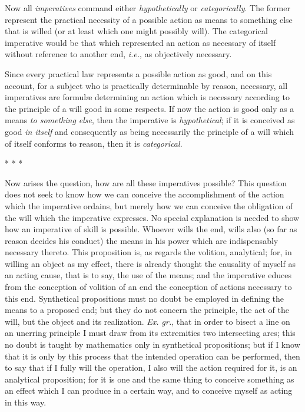 Now all \textit{imperatives} command either \textit{hypothetically} or
\textit{categorically}. The former represent the practical necessity
of a possible action as means to something else that is willed (or at
least which one might possibly will). The categorical imperative would
be that which represented an action as necessary of itself without
reference to another end, \textit{i.e.}, as objectively necessary.

Since every practical law represents a possible action as good, and on
this account, for a subject who is practically determinable by reason,
necessary, all imperatives are formul\ae{} determining an action which
is necessary according to the principle of a will good in some
respects. If now the action is good only as a means \textit{to
something else}, then the imperative is \textit{hypothetical}; if it
is conceived as good \textit{in itself} and consequently as being
necessarily the principle of a will which of itself conforms to
reason, then it is \textit{categorical}.

\begin{center}* * *\end{center}

Now arises the question, how are all these imperatives
possible? This question does not seek to know how we can conceive the
accomplishment of the action which the imperative ordains, but merely
how we can conceive the obligation of the will which the imperative
expresses. No special explanation is needed to show how an imperative
of skill is possible. Whoever wills the end, wills also (so far as
reason decides his conduct) the means in his power which are
indispensably necessary thereto. This proposition is, as regards the
volition, analytical; for, in willing an object as my effect, there is
already thought the causality of myself as an acting cause, that is to
say, the use of the means; and the imperative educes from the
conception of volition of an end the conception of actions necessary
to this end. Synthetical propositions must no doubt be employed in
defining the means to a proposed end; but they do not concern the
principle, the act of the will, but the object and its realization.
\textit{Ex. gr.}, that in order to bisect a line on an unerring
principle I must draw from its extremities two intersecting arcs; this
no doubt is taught by mathematics only in synthetical propositions;
but if I know that it is only by this process that the intended
operation can be performed, then to say that if I fully will the
operation, I also will the action required for it, is an analytical
proposition; for it is one and the same thing to conceive something as
an effect which I can  produce in a certain way, and to
conceive myself as acting in this way.

